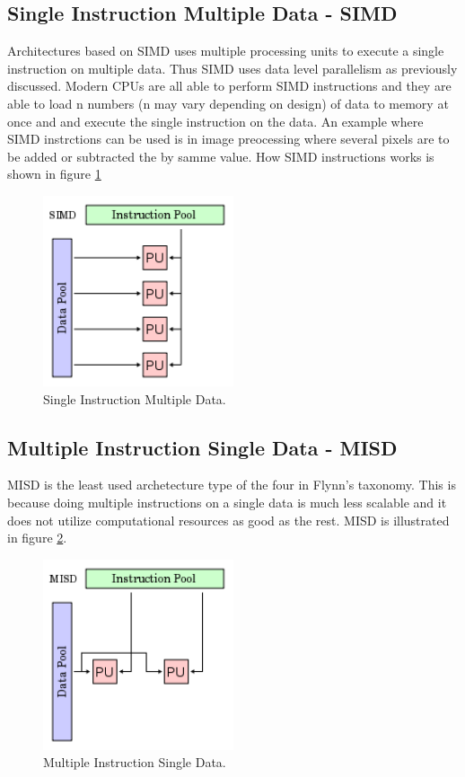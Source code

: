 \subsection*{Single Instruction Multiple Data - SIMD}
Architectures based on SIMD uses  multiple processing units to execute a single instruction on multiple data. Thus SIMD uses data level parallelism as previously discussed. Modern CPUs are all able to perform SIMD instructions and they are able to load n numbers (n may vary depending on design) of data to memory at once and and execute the single instruction on the data. An example where SIMD instrctions can be used is in image preocessing where several pixels are to be added or subtracted the by samme value. How SIMD instructions works is shown in figure \ref{SIMD}
\begin{figure}[h!]
\centering
\includegraphics[width=0.50\textwidth]{parallel/SIMD}
\caption{Single Instruction Multiple Data.}
\label{SIMD}
\end{figure}

\subsection*{Multiple Instruction Single Data - MISD}
MISD is the least used archetecture type of the four in Flynn's taxonomy. This is because doing multiple instructions on a single data is much less scalable and it does not utilize computational resources as good as the rest. MISD is illustrated in figure \ref{MISD}.
\begin{figure}[h!]
\centering
\includegraphics[width=0.50\textwidth]{parallel/MISD}
\caption{Multiple Instruction Single Data.}
\label{MISD}
\end{figure}

